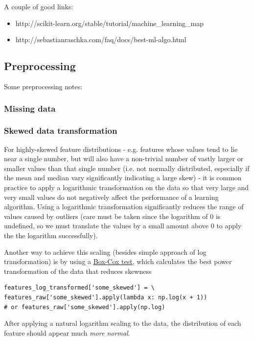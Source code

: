 \documentclass[11pt]{article}
\begin{document}
A couple of good links:
\begin{itemize}
	\item http://scikit-learn.org/stable/tutorial/machine\_learning\_map
	\item http://sebastianraschka.com/faq/docs/best-ml-algo.html
\end{itemize}

\subsection{Preprocessing}
Some preprocessing notes:

\subsubsection*{Missing data}

\subsubsection*{Skewed data transformation}
For highly-skewed feature distributions - e.g. features whose values tend to lie near a single number, but will also have a non-trivial number of vastly larger or smaller values than that single number (i.e. not normally distributed, especially if the mean and median vary significantly indicating a large skew) - it is common practice to apply a  logarithmic transformation on the data so that very large and very small values do not negatively affect the performance of a learning algorithm. Using a logarithmic transformation significantly reduces the range of values caused by outliers (care must be taken since the logarithm of 0 is undefined, so we must translate the values by a small amount above 0 to apply the the logarithm successfully).

Another way to achieve this scaling (besides simple approach of log transformation)  is by using a \href{https://scipy.github.io/devdocs/generated/scipy.stats.boxcox.html}{Box-Cox test}, which calculates the best power transformation of the data that reduces skewness 
\begin{lstlisting}
features_log_transformed['some_skewed'] = \
features_raw['some_skewed'].apply(lambda x: np.log(x + 1))
# or features_raw['some_skewed'].apply(np.log)
\end{lstlisting}
After applying a natural logarithm scaling to the data, the distribution of each feature should appear much \textit{more normal}.
\end{document}
